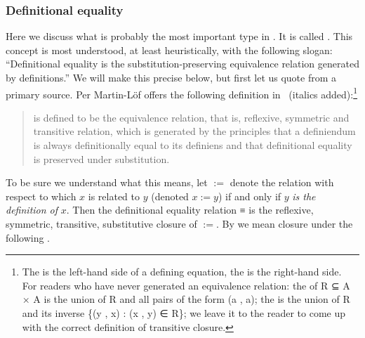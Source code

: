 \subsubsection{Definitional equality}\label{sec:defin-equal}
Here we discuss what is probably the most important type in \mltt. It is called . This concept is most understood, at least heuristically, with the following slogan: ``Definitional equality is the substitution-preserving equivalence relation generated by definitions.''
We will make this precise below, but first let us quote from a primary source. Per Martin-L\"of offers the following definition in~\cite[\S1.11]{MR0387009} (italics added):\footnote{The  is the left-hand side of a defining equation, the  is the right-hand side.\\ For readers who have never generated an equivalence relation: the  of \ab R \af ⊆ \ab A \ad × \ab A is the union of \ab R and all pairs of the form (\ab a , \ab a); the  is the union of \ab R and its inverse \{(\ab y , \ab x) : (\ab x , \ab y) ∈ \ab R\}; we leave it to the reader to come up with the correct definition of transitive closure.}
\begin{quote}
   is defined to be the equivalence relation, that is, reflexive, symmetric and transitive relation, which is generated by the principles that a definiendum is always definitionally equal to its definiens and that definitional equality is preserved under substitution.
\end{quote}
To be sure we understand what this means, let $:=$ denote the relation with respect to which $x$ is related to $y$ (denoted $x := y$) if and only if $y$ \emph{is the definition of} $x$.  Then the definitional equality relation \ad ≡ is the reflexive, symmetric, transitive, substitutive closure of $:=$. By  we mean closure under the following .
\vskip3mm\hskip1cm \\[-5pt]


